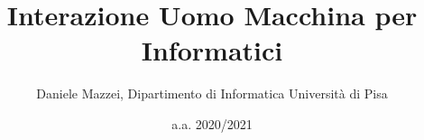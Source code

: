 \documentclass[a4paper,11pt,twoside]{book}
\begin{document}
\title{Interazione Uomo Macchina per Informatici}
\author[1]{Daniele Mazzei, Dipartimento di Informatica Università di Pisa}
\date{a.a. 2020/2021}
\maketitle

\tableofcontents

%
%
%
%
%
\end{document}
